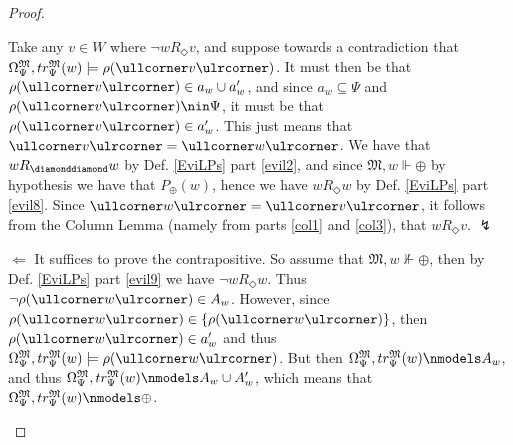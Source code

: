 \documentclass[11pt]{article}
\newcommand{\DD}{\diamonddiamond}
\newcommand{\Pos}{\Diamond}
\newcommand{\lc}{\ullcorner}
\newcommand{\rc}{\ulrcorner}
\begin{document}
\begin{proof}
\begin{peano}
\begin{peano}
Take any $v \in W$ where $\neg w R_\Pos v$, and suppose towards a contradiction that $\Omega_{\Psi}^\mathfrak{M}, tr_{\Psi}^\mathfrak{M}(w) \models \rho(\lc v \rc)$.  It must then be that $\rho(\lc v \rc) \in a_w \cup a'_w$, and since $a_w \subseteq \Psi$ and $\rho(\lc v \rc) \nin \Psi$, it must be that $\rho(\lc v \rc) \in a'_w$.  This just means that $\lc v \rc = \lc w \rc$.  We have that $w R_\DD w$ by Def. \ref{EviLPs} part \ref{evil2}, and since $\mathfrak{M},w \Vdash \oplus$ by hypothesis we have that $P_\oplus(w)$, hence we have $w R_\Pos w$ by  Def. \ref{EviLPs} part \ref{evil8}.  Since $\lc w \rc = \lc v \rc$, it follows from the Column Lemma (namely from parts \ref{col1} and \ref{col3}), that $w R_\Pos v$. $\lightning$

 	\item $\Leftarrow$ It suffices to prove the contrapositive. So assume that $\mathfrak{M},w \nVdash \oplus$, then by Def. \ref{EviLPs} part \ref{evil9} we have $\neg w R_\Pos w$.  Thus $\neg \rho(\lc w \rc) \in A_w$.  However, since $\rho(\lc w \rc) \in \{ \rho(\lc w \rc) \}$, then $\rho(\lc w \rc) \in a'_w$ and thus $\Omega_{\Psi}^\mathfrak{M}, tr_{\Psi}^\mathfrak{M}(w) \models \rho(\lc w \rc)$.  But then $\Omega_{\Psi}^\mathfrak{M}, tr_{\Psi}^\mathfrak{M}(w) \nmodels A_w$, and thus $\Omega_{\Psi}^\mathfrak{M}, tr_{\Psi}^\mathfrak{M}(w) \nmodels A_w \cup A'_w$, which means that $\Omega_{\Psi}^\mathfrak{M}, tr_{\Psi}^\mathfrak{M}(w) \nmodels \oplus$.
 \end{peano}
 \end{peano}
 \end{proof}
\pagebreak
{}


\end{document}

